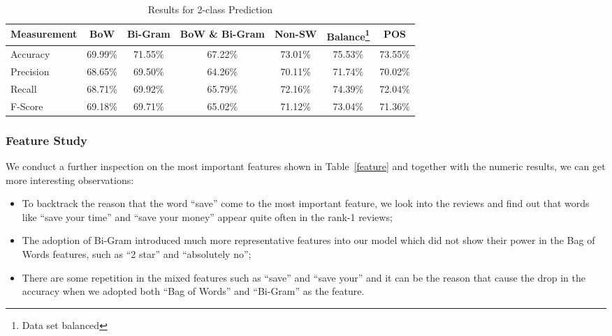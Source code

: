 \documentclass[12pt]{article}
\begin{document}
\begin{table*}[!htbp]
\centering
\caption{Results for 2-class Prediction}\label{result2}
\begin{tabular}{lcccccc}
\hline
\hline
Measurement& BoW & Bi-Gram & BoW \& Bi-Gram & Non-SW & Balance\footnote{Data set balanced}& POS\\
 \hline
Accuracy&69.99\%&71.55\%&67.22\%&73.01\%&75.53\%&73.55\%\\
Precision&68.65\%&69.50\%&64.26\%&70.11\%&71.74\%&70.02\%\\
Recall&68.71\%&69.92\%&65.79\%&72.16\%&74.39\%&72.04\%\\
F-Score&69.18\%&69.71\%&65.02\%&71.12\%&73.04\%&71.36\%\\
\hline
\hline
\end{tabular}
\end{table*}

\subsubsection{Feature Study}
We conduct a further inspection on the most important features shown in Table~\ref{feature} and together with the numeric results, we can get more interesting observations:
\begin{itemize}
\item To backtrack the reason that the word ``save'' come to the most important feature, we look into the reviews and find out that words like ``save your time'' and ``save your money'' appear quite often in the rank-1 reviews;
\item The adoption of Bi-Gram introduced much more representative features into our model which did not show their power in the Bag of Words features, such as ``2 star'' and ``absolutely no'';
\item There are some repetition in the mixed features such as ``save'' and ``save your'' and it can be the reason that cause the drop in the accuracy when we adopted both ``Bag of Words'' and ``Bi-Gram'' as the feature.
\end{itemize}
 
\end{document}
